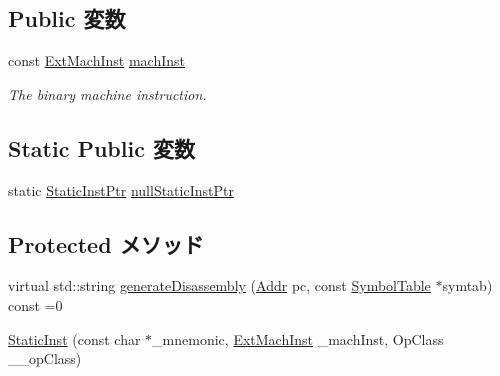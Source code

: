 \subsection*{Public 変数}
\begin{DoxyCompactItemize}
\item 
const \hyperlink{classStaticInst_a5605d4fc727eae9e595325c90c0ec108}{ExtMachInst} \hyperlink{classStaticInst_a744598b194ca3d4201d9414ce4cc4af4}{machInst}
\begin{DoxyCompactList}\small\item\em The binary machine instruction. \item\end{DoxyCompactList}\end{DoxyCompactItemize}
\subsection*{Static Public 変数}
\begin{DoxyCompactItemize}
\item 
static \hyperlink{classRefCountingPtr}{StaticInstPtr} \hyperlink{classStaticInst_aa793d9793af735f09096369fb17567b6}{nullStaticInstPtr}
\end{DoxyCompactItemize}
\subsection*{Protected メソッド}
\begin{DoxyCompactItemize}
\item 
virtual std::string \hyperlink{classStaticInst_ab4a569d2623620c04f8a52bbd91d63b9}{generateDisassembly} (\hyperlink{base_2types_8hh_af1bb03d6a4ee096394a6749f0a169232}{Addr} pc, const \hyperlink{classSymbolTable}{SymbolTable} $\ast$symtab) const =0
\item 
\hyperlink{classStaticInst_ac0187fed42aee18cd56cec8a03699653}{StaticInst} (const char $\ast$\_\-mnemonic, \hyperlink{classStaticInst_a5605d4fc727eae9e595325c90c0ec108}{ExtMachInst} \_\-machInst, OpClass \_\-\_\-opClass)
\end{DoxyCompactItemize}
